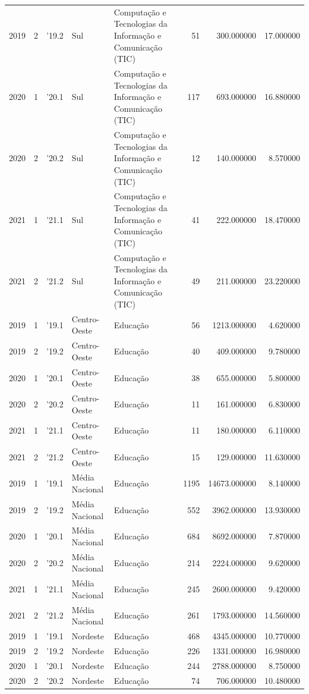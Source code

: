 \begin{longtable}{rrlllrrr}
2019 & 2 & '19.2 & Sul & Computação e Tecnologias da Informação e Comunicação (TIC) & 51 & 300.000000 & 17.000000 \\
2020 & 1 & '20.1 & Sul & Computação e Tecnologias da Informação e Comunicação (TIC) & 117 & 693.000000 & 16.880000 \\
2020 & 2 & '20.2 & Sul & Computação e Tecnologias da Informação e Comunicação (TIC) & 12 & 140.000000 & 8.570000 \\
2021 & 1 & '21.1 & Sul & Computação e Tecnologias da Informação e Comunicação (TIC) & 41 & 222.000000 & 18.470000 \\
2021 & 2 & '21.2 & Sul & Computação e Tecnologias da Informação e Comunicação (TIC) & 49 & 211.000000 & 23.220000 \\
2019 & 1 & '19.1 & Centro-Oeste & Educação & 56 & 1213.000000 & 4.620000 \\
2019 & 2 & '19.2 & Centro-Oeste & Educação & 40 & 409.000000 & 9.780000 \\
2020 & 1 & '20.1 & Centro-Oeste & Educação & 38 & 655.000000 & 5.800000 \\
2020 & 2 & '20.2 & Centro-Oeste & Educação & 11 & 161.000000 & 6.830000 \\
2021 & 1 & '21.1 & Centro-Oeste & Educação & 11 & 180.000000 & 6.110000 \\
2021 & 2 & '21.2 & Centro-Oeste & Educação & 15 & 129.000000 & 11.630000 \\
2019 & 1 & '19.1 & Média Nacional & Educação & 1195 & 14673.000000 & 8.140000 \\
2019 & 2 & '19.2 & Média Nacional & Educação & 552 & 3962.000000 & 13.930000 \\
2020 & 1 & '20.1 & Média Nacional & Educação & 684 & 8692.000000 & 7.870000 \\
2020 & 2 & '20.2 & Média Nacional & Educação & 214 & 2224.000000 & 9.620000 \\
2021 & 1 & '21.1 & Média Nacional & Educação & 245 & 2600.000000 & 9.420000 \\
2021 & 2 & '21.2 & Média Nacional & Educação & 261 & 1793.000000 & 14.560000 \\
2019 & 1 & '19.1 & Nordeste & Educação & 468 & 4345.000000 & 10.770000 \\
2019 & 2 & '19.2 & Nordeste & Educação & 226 & 1331.000000 & 16.980000 \\
2020 & 1 & '20.1 & Nordeste & Educação & 244 & 2788.000000 & 8.750000 \\
2020 & 2 & '20.2 & Nordeste & Educação & 74 & 706.000000 & 10.480000 \\

\end{longtable}
